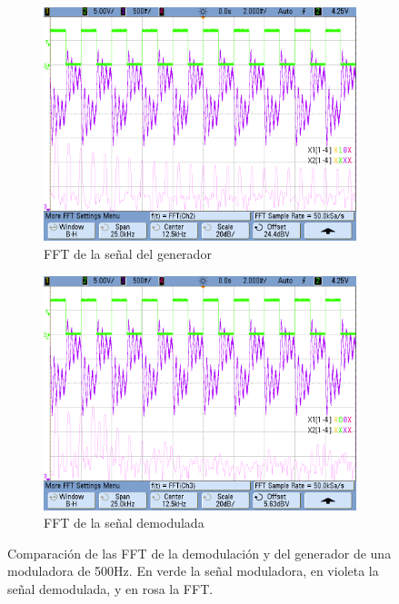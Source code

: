 \documentclass[../../tc_tp6_main.tex]{subfiles}
\begin{document}
\begin{figure}[H]	%
	\centering
	\begin{subfigure}[t]{0.45\textwidth}
		\centering
		\includegraphics[width=\textwidth]{figures/fm_rc_sq_500_gen.png}
		\caption{FFT de la se\~nal del generador}
		\label{fig:fm_rc_sq_500_gen}
	\end{subfigure}%
	\hfill%
	\begin{subfigure}[t]{0.45\textwidth}
		\centering
		\includegraphics[width=\textwidth]{figures/fm_rc_sq_500_demod.png}
		\caption{FFT de la se\~nal demodulada}
		\label{fig:fm_rc_sq_500_demod}
	\end{subfigure}
	\caption{Comparaci\'on de las FFT de la demodulaci\'on y del generador de una moduladora de 500Hz. En verde la se\~nal moduladora, en violeta la se\~nal demodulada, y en rosa la FFT.}
	\label{fig:fm_rc_sq_500}
\end{figure}
\end{document}
